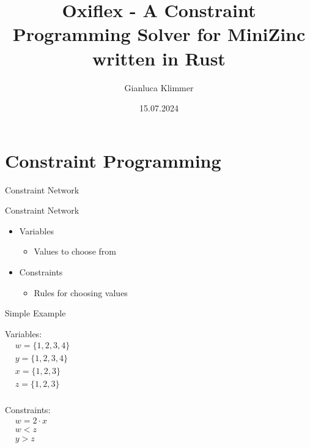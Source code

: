\documentclass[mathserif,table]{gkibeamer-aaai}
\title[Oxiflex - Constraint Programming Solver for MiniZinc]{Oxiflex - A Constraint Programming Solver for MiniZinc written in Rust}
\author[G.\ Klimmer]{Gianluca Klimmer}
\institute[unibas]{University of Basel}
\date{15.07.2024}
\begin{document}
\section{Constraint Programming}

\begin{frame}
\end{frame}

\begin{frame}
	\begin{center}
		\LARGE{Constraint Network}
	\end{center}
\end{frame}

\begin{frame}{Constraint Network}
	\begin{itemize}
		\item Variables
		      \begin{itemize}
			      \item Values to choose from
		      \end{itemize}
		\item Constraints
		      \begin{itemize}
			      \item Rules for choosing values
		      \end{itemize}
	\end{itemize}
\end{frame}

\begin{frame}{Simple Example}
	\begin{multicols}{2}
		\large{Variables:} \\
		\vspace{0.5cm}
		\hspace{0.5cm}
		$\begin{aligned}
				 & w = \{1, 2, 3, 4\} \\
				 & y = \{1, 2, 3, 4\} \\
				 & x = \{1, 2, 3\}    \\
				 & z = \{1, 2, 3\}    \\
			\end{aligned}$

		\columnbreak

		\large{Constraints:} \\
		\vspace{0.5cm}
		\hspace{0.5cm}
		$\begin{aligned}
				 & w = 2 \cdot x \\
				 & w < z         \\
				 & y > z         \\
			\end{aligned}$
	\end{multicols}
\end{frame}
\end{document}
